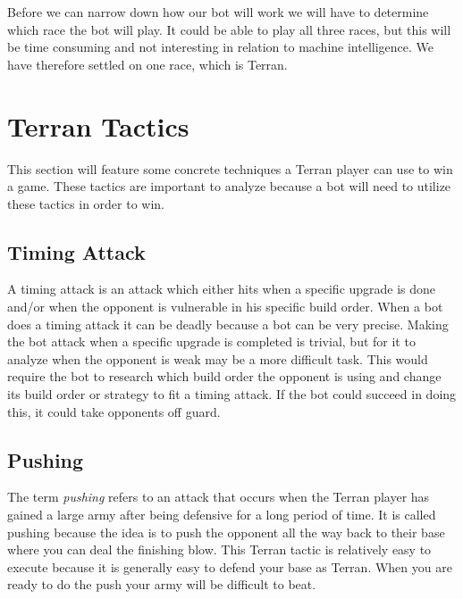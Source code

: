 Before we can narrow down how our bot will work we will have to determine which race the bot will play. It could be able to play all three races, but 
this will be time consuming and not interesting in relation to machine intelligence. We have therefore settled on one race, which is Terran.

\section{Terran Tactics}
	This section will feature some concrete techniques a Terran player can use to win a game. 
	These tactics are important to analyze because a bot will need to utilize these tactics in order to win.
	
	\subsection{Timing Attack}
		A timing attack is an attack which either hits when a specific upgrade is done and/or when the opponent is vulnerable in his specific build order. 
		When a bot does a timing attack it can be deadly because a bot can be very precise. 
		Making the bot attack when a specific upgrade is completed is trivial, but for it to 
		analyze when the opponent is weak may be a more difficult task. 
		This would require the bot to research which build order the opponent is using and change its build order or strategy to fit a timing attack. 
		If the bot could succeed in doing this, it could take opponents off guard.
		
	\subsection{Pushing}
		The term \textit{pushing} refers to an attack that occurs when the Terran player has gained a large army after being defensive for a long 
		period of time. It is called pushing because the idea is to push the opponent 
		all the way back to their base where you can deal the finishing blow. This Terran tactic is relatively easy to execute because it is generally
		easy to defend your base as Terran. When you are ready to do the push your army will be difficult to beat.
		

